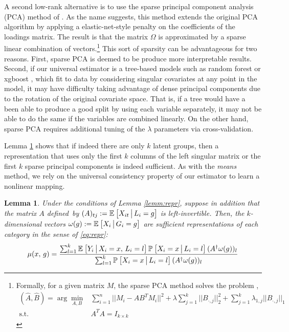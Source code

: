 \documentclass{article}
\theoremstyle{plain}
\newtheorem{lemm}[prop]{Lemma}
\theoremstyle{definition}
\theoremstyle{remark}
\begin{document}
A second low-rank alternative is to use the sparse principal component analysis (PCA) method of \cite{zou2006sparse}. As the name suggests, this method extends the original PCA algorithm by applying a elastic-net-style penalty on the coefficients of the loadings matrix. The result is that the matrix $\Omega$ is approximated by a sparse linear combination of vectors.\footnote{Formally, for a given matrix $M$, the sparse PCA method solves the problem \citep[~eq. 3.12]{zou2006sparse},
\begin{align}
    (\hat{A},\hat{B}) = \arg\min_{A,B} &\sum_{i=1}^n ||M_i - AB^TM_i||^2+ \lambda \sum_{j=1}^k ||B_{\cdot,j} ||_{2}^2 + \sum_{j=1}^k \lambda_{1,j} ||B_{\cdot,j}||_1\\
    \text{s.t.} \quad & A^TA = I_{k \times k}
    \label{eq:sparse_pca}
\end{align}
} This sort of sparsity can be advantageous for two reasons. First, sparse PCA is deemed to be produce more interpretable results. Second, if our universal estimator is a tree-based models such as random forest \cite{breiman2001random} or xgboost \cite{chen2016xgboost}, which fit to data by considering singular covariates at any point in the model, it may have difficulty taking advantage of dense principal components due to the rotation of the original covariate space. That is, if a tree would have a been able to produce a good split by using each variable separately, it may not be able to do the same if the variables are combined linearly. On the other hand, sparse PCA requires additional tuning of the $\lambda$ parameters via cross-validation.

Lemma \ref{lemm:lowrank} shows that if indeed there are only $k$ latent groups, then a representation that uses only the first $k$ columns of the left singular matrix or the first $k$ sparse principal components is indeed sufficient. As with the \emph{means} method, we rely on the universal consistency property of our estimator to learn a nonlinear mapping.

\begin{lemm}
\label{lemm:lowrank}
Under the conditions of Lemma \ref{lemm:repr}, suppose in addition that the matrix $A$ defined~by $(A)_{tj} := \mathbb{E}_{}\left[X_{it} \,\big|\, L_{i} = g\right]$
is left-invertible. Then, the $k$-dimensional vectors $\omega(g) := \mathbb{E}_{}\left[X_{i} \,\big|\, G_i = g\right]$ are sufficient representations of each category in the sense of \eqref{eq:repr}:
\begin{equation}
\label{eq:explicit_mom}
\mu(x, \, g) = \frac{\sum_{l = 1}^k  \mathbb{E}_{}\left[Y_i \,\big|\, X_i = x, \, L_i = l\right] \mathbb{P}_{}\left[X_i = x \,\big|\, L_i = l\right] (A^\dagger \omega(g))_l}{\sum_{l = 1}^k \mathbb{P}_{}\left[X_i = x \,\big|\, L_i = l\right] (A^\dagger \omega(g))_l}
\end{equation}
\end{lemm}
\end{document}
